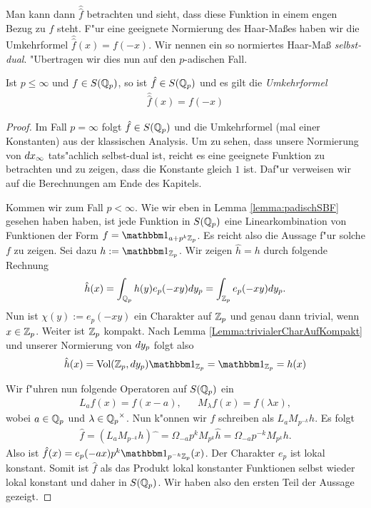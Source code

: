 		Man kann dann $\hat{\hat{f}}$ betrachten und sieht, dass diese Funktion in einem engen Bezug zu $f$ steht. 
		F"ur eine geeignete Normierung des Haar-Maßes haben wir die Umkehrformel  $\hat{\hat{f}}(x)=f(-x)$.
		Wir nennen ein so normiertes Haar-Maß \emph{selbst-dual}.
		"Ubertragen wir dies nun auf den $p$-adischen Fall.
		\begin{satz}\label{satz:lokal:umkehrformel}
			Ist $p\leq\infty$ und $f\in\Sw(\Kp)$, so ist $\hat{f} \in \Sw(\Kp)$ und es gilt die \emph{Umkehrformel}
			\begin{align*}
				\hat{\hat{f}}(x) = f(-x)
			\end{align*}
		\end{satz}
		\begin{proof}
			Im Fall $p=\infty$ folgt $\hat{f} \in \Sw(\Kp)$ und die Umkehrformel (mal einer Konstanten) aus der klassischen Analysis.
			Um zu sehen, dass unsere Normierung von $\dx_\infty$ tats"achlich selbst-dual ist, reicht es eine geeignete Funktion zu betrachten und zu zeigen, dass die Konstante gleich $1$ ist. 
			Daf"ur verweisen wir auf die Berechnungen am Ende des Kapitels.
			
			Kommen wir zum Fall $p<\infty$. 
			Wie wir eben in Lemma \ref{lemma:padischSBF} gesehen haben haben, ist jede Funktion in $\Sw(\Kp)$ eine Linearkombination von Funktionen der Form $f = \ind_{a+p^k\Zp}$. 
			Es reicht also die Aussage f"ur solche $f$ zu zeigen.
			Sei dazu $h:= \ind_{\Zp}$. Wir zeigen $\hat{h} = h$ durch folgende Rechnung
			\begin{align*}
				\hat{h}(x) = \int_\Kp h(y) e_p (-xy) dy_p = \int_\Zp e_p(-xy) dy_p.
			\end{align*}
			Nun ist $\chi(y):=e_p(-xy)$ ein Charakter auf $\Zp$ und genau dann trivial, wenn $x\in\Zp$. 
			Weiter ist $\Zp$ kompakt. 
			Nach Lemma \ref{Lemma:trivialerCharAufKompakt} und unserer Normierung von $\dx[y]_p$ folgt also
			\begin{align*}
				\hat{h}(x) = \text{Vol}(\Zp, dy_p) \ind_\Zp = \ind_\Zp = h(x)
			\end{align*}
			
			Wir f"uhren nun folgende Operatoren auf $\Sw(\Kp)$ ein
			\begin{align*}
				L_a f(x) = f(x-a),& &M_\lambda f(x) = f(\lambda x),
			\end{align*}
			wobei $a \in \Kp$ und $\lambda \in \Kp^\times$. 
			Nun k"onnen wir $f$ schreiben als $L_a M_{p^{-k}}h$. 
			Es folgt
			\begin{align*}
				\hat{f} = (L_a M_{p^{-k}}h)\widehat{\phantom{x}} = \Omega_{-a}p^{k}M_{p^k}\hat{h}=\Omega_{-a}p^{-k}M_{p^k}h.
			\end{align*}
			Also ist $\hat{f} (x) = e_p(-ax)p^k\ind_{p^{-k}\Zp}(x)$. 
			Der Charakter $e_p$ ist lokal konstant.
			Somit ist $\hat{f}$ als das Produkt lokal konstanter Funktionen selbst wieder lokal konstant und daher in $\Sw(\Kp)$. 
			Wir haben also den ersten Teil der Aussage gezeigt.
			

\end{proof}
